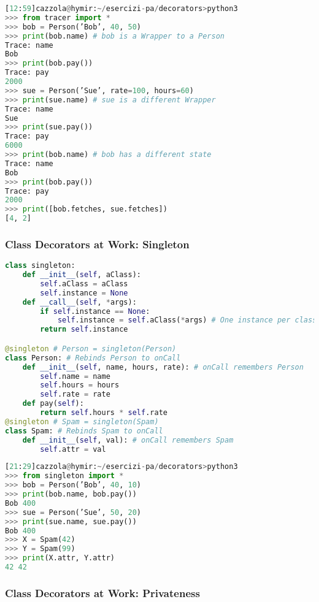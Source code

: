 \begin{lstlisting}[language=Python]
[12:59]cazzola@hymir:~/esercizi-pa/decorators>python3
>>> from tracer import *
>>> bob = Person(’Bob’, 40, 50)
>>> print(bob.name) # bob is a Wrapper to a Person
Trace: name
Bob
>>> print(bob.pay())
Trace: pay
2000
>>> sue = Person(’Sue’, rate=100, hours=60)
>>> print(sue.name) # sue is a different Wrapper
Trace: name
Sue
>>> print(sue.pay())
Trace: pay
6000
>>> print(bob.name) # bob has a different state
Trace: name
Bob
>>> print(bob.pay())
Trace: pay
2000
>>> print([bob.fetches, sue.fetches])
[4, 2]
\end{lstlisting}


\subsubsection{Class Decorators at Work: Singleton}

\begin{lstlisting}[language=Python]
class singleton:
	def __init__(self, aClass):
		self.aClass = aClass
		self.instance = None
	def __call__(self, *args):
		if self.instance == None:
			self.instance = self.aClass(*args) # One instance per class
		return self.instance

@singleton # Person = singleton(Person)
class Person: # Rebinds Person to onCall
	def __init__(self, name, hours, rate): # onCall remembers Person
		self.name = name
		self.hours = hours
		self.rate = rate
	def pay(self):
		return self.hours * self.rate
@singleton # Spam = singleton(Spam)
class Spam: # Rebinds Spam to onCall
	def __init__(self, val): # onCall remembers Spam
		self.attr = val
\end{lstlisting}

\begin{lstlisting}[language=Python]
[21:29]cazzola@hymir:~/esercizi-pa/decorators>python3
>>> from singleton import *
>>> bob = Person(’Bob’, 40, 10)
>>> print(bob.name, bob.pay())
Bob 400
>>> sue = Person(’Sue’, 50, 20)
>>> print(sue.name, sue.pay())
Bob 400
>>> X = Spam(42)
>>> Y = Spam(99)
>>> print(X.attr, Y.attr)
42 42
\end{lstlisting}

\subsubsection{Class Decorators at Work: Privateness}

